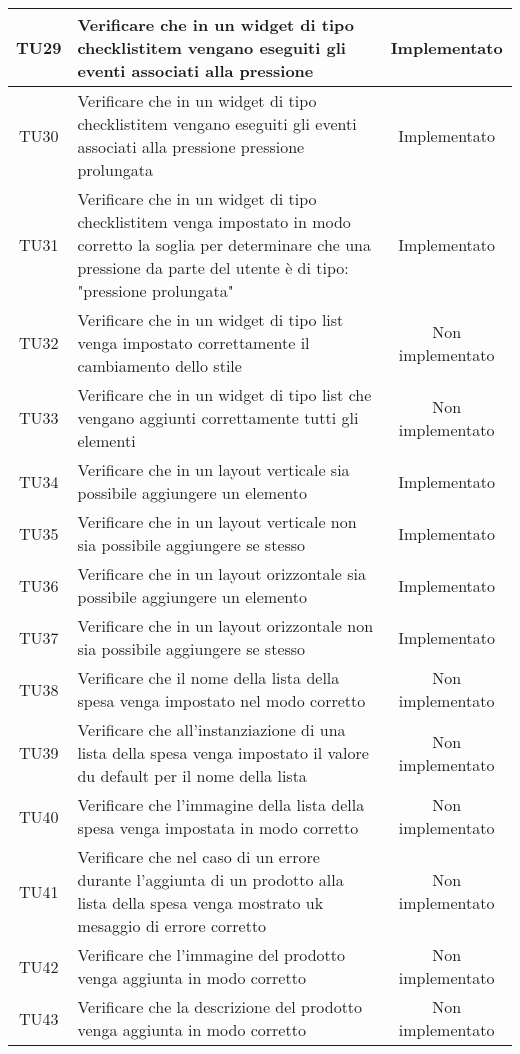 \begin{center}
\begin{longtable}{|c|>{\centering}m{10cm}|c|}
		TU29 & Verificare che in un widget di tipo checklistitem vengano eseguiti gli eventi associati alla pressione & Implementato \\ \hline
		TU30 & Verificare che in un widget di tipo checklistitem vengano eseguiti gli eventi associati alla pressione pressione prolungata & Implementato \\ \hline
		TU31 & Verificare che in un widget di tipo checklistitem venga impostato in modo corretto la soglia per determinare che una pressione da parte del utente è di tipo: "pressione prolungata" & Implementato \\ \hline
		TU32 & Verificare che in un widget di tipo list venga impostato correttamente il cambiamento dello stile & Non implementato \\ \hline
		TU33 & Verificare che in un widget di tipo list che vengano aggiunti correttamente tutti gli elementi & Non implementato \\ \hline
		TU34 & Verificare che in un layout verticale sia possibile aggiungere un elemento & Implementato \\ \hline
		TU35 & Verificare che in un layout verticale non sia possibile aggiungere se stesso & Implementato \\ \hline
		TU36 & Verificare che in un layout orizzontale sia possibile aggiungere un elemento & Implementato \\ \hline
		TU37 & Verificare che in un layout orizzontale non sia possibile aggiungere se stesso & Implementato \\ \hline
		TU38 & Verificare che il nome della lista della spesa venga impostato nel modo corretto & Non implementato \\ \hline
		TU39 & Verificare che all'instanziazione di una lista della spesa venga impostato il valore du default per il nome della lista & Non implementato \\ \hline
		TU40 & Verificare che l'immagine della lista della spesa venga impostata in modo corretto & Non implementato \\ \hline
		TU41 & Verificare che nel caso di un errore durante l'aggiunta di un prodotto alla lista della spesa venga mostrato uk mesaggio di errore corretto & Non implementato \\ \hline
		TU42 & Verificare che l'immagine del prodotto venga aggiunta in modo corretto & Non implementato \\ \hline
		TU43 & Verificare che la descrizione del prodotto venga aggiunta in modo corretto & Non implementato \\ \hline

\end{longtable}
\end{center}
